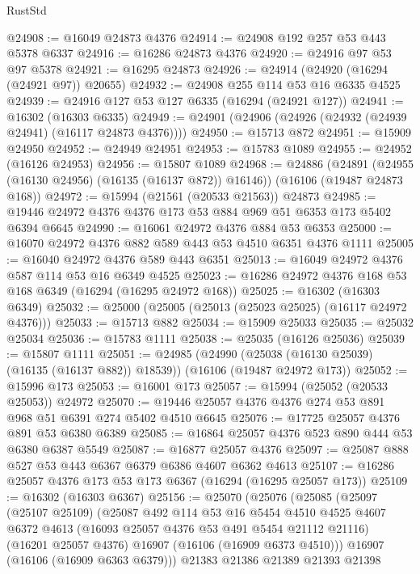 \begin{lexlean}{RustStd}
\begin{coremodule}
@24908 := @16049 @24873 @4376
@24914 := @24908 @192 @257 @53 @443 @5378 @6337
@24916 := @16286 @24873 @4376
@24920 := @24916 @97 @53 @97 @5378
@24921 := @16295 @24873
@24926 := @24914 (@24920 (@16294 (@24921 @97)) @20655)
@24932 := @24908 @255 @114 @53 @16 @6335 @4525
@24939 := @24916 @127 @53 @127 @6335 (@16294 (@24921 @127))
@24941 := @16302 (@16303 @6335)
@24949 := @24901 (@24906 (@24926 (@24932 (@24939 @24941) (@16117 @24873 @4376))))
@24950 := @15713 @872
@24951 := @15909 @24950
@24952 := @24949 @24951
@24953 := @15783 @1089
@24955 := @24952 (@16126 @24953)
@24956 := @15807 @1089
@24968 := @24886
    (@24891 (@24955 (@16130 @24956) (@16135 (@16137 @872)) @16146))
    (@16106 (@19487 @24873 @168))
@24972 := @15994 (@21561 (@20533 @21563)) @24873
@24985 := @19446 @24972 @4376 @4376 @173 @53 @884 @969 @51 @6353 @173 @5402 @6394 @6645
@24990 := @16061 @24972 @4376 @884 @53 @6353
@25000 := @16070 @24972 @4376 @882 @589 @443 @53 @4510 @6351 @4376 @1111
@25005 := @16040 @24972 @4376 @589 @443 @6351
@25013 := @16049 @24972 @4376 @587 @114 @53 @16 @6349 @4525
@25023 := @16286 @24972 @4376 @168 @53 @168 @6349 (@16294 (@16295 @24972 @168))
@25025 := @16302 (@16303 @6349)
@25032 := @25000 (@25005 (@25013 (@25023 @25025) (@16117 @24972 @4376)))
@25033 := @15713 @882
@25034 := @15909 @25033
@25035 := @25032 @25034
@25036 := @15783 @1111
@25038 := @25035 (@16126 @25036)
@25039 := @15807 @1111
@25051 := @24985
    (@24990 (@25038 (@16130 @25039) (@16135 (@16137 @882)) @18539))
    (@16106 (@19487 @24972 @173))
@25052 := @15996 @173
@25053 := @16001 @173
@25057 := @15994 (@25052 (@20533 @25053)) @24972
@25070 := @19446 @25057 @4376 @4376 @274 @53 @891 @968 @51 @6391 @274 @5402 @4510 @6645
@25076 := @17725 @25057 @4376 @891 @53 @6380 @6389
@25085 := @16864 @25057 @4376 @523 @890 @444 @53 @6380 @6387 @5549
@25087 := @16877 @25057 @4376
@25097 := @25087 @888 @527 @53 @443 @6367 @6379 @6386 @4607 @6362 @4613
@25107 := @16286 @25057 @4376 @173 @53 @173 @6367 (@16294 (@16295 @25057 @173))
@25109 := @16302 (@16303 @6367)
@25156 := @25070
    (@25076
      (@25085
        (@25097
          (@25107 @25109)
          (@25087
            @492
            @114
            @53
            @16
            @5454
            @4510
            @4525
            @4607
            @6372
            @4613
            (@16093 @25057 @4376 @53 @491 @5454 @21112 @21116)
            (@16201 @25057 @4376)
            @16907
            (@16106 (@16909 @6373 @4510)))
          @16907
          (@16106 (@16909 @6363 @6379)))
        @21383
        @21386
        @21389
        @21393
        @21398

\end{coremodule}
\end{lexlean}
